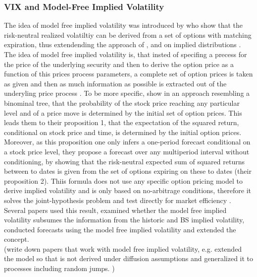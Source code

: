 \subsubsection{VIX and Model-Free Implied Volatility}
The idea of model free implied volatility was introduced by \textcite{britten2000} who show that the risk-neutral realized volatiltiy can be derived from a set of options with matching expiration, thus extendending the approach of \textcite{derman1994} \textcite{dupire1994}, \textcite{dupire1997} and \textcite{rubinstein1994} on implied distributions \parencite{jiang2003}. The idea of model free implied volatility is, that insted of specifing a precess for the price of the underlying security and then to derive the option price as a function of this prices process parameters,  a complete set of option prices is taken as given and then as much information as possible is extracted out of the underyling price process \parencite{britten2000}. To be more specific, \textcite{britten2000} show in an approach resembling a binominal tree, that the probability of the stock price reaching any particular level and of a price move is determined by the initial set of option prices. This leads them to their proposition 1, that the expectation of the squared return, conditional on stock price and time, is determined by the initial option prices. Moreover, as this proposition one only infers a one-period forecast conditional on a stock price level, they propose a forecast over any multiperiod interval without conditioning, by showing that the risk-neutral expected sum of squared returns between to dates is given from the set of options expiring on these to dates (their proposition 2). Thiis formula does not use any specific option pricing model to derive implied volatility and is only based on no-arbitrage conditions, therefore it solves the joint-hypothesis problem and test directly for market efficiency \parencite{jiang2003}.  \\
Several papers used this result, examined whether the model free implied volatility subsumes the information from the historic and \gls{BS} implied volatility, conducted forecasts using the model free implied volatility and extended the concept.\\
(write down papers that work with model free implied volatility, e.g. \citeauthor{jiang2003} extended the model so that is not derived under diffusion assumptions and generalized it to processes including random jumps. )\\
